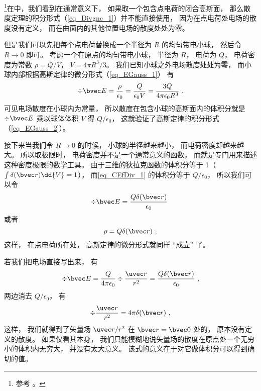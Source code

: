 

\footnote{参考 \cite{GriffE}。}在中，我们看到在通常意义下， 如果取一个包含点电荷的闭合高斯面， 那么散度定理的积分形式（\autoref{eq_Divgnc_1}）并不能直接使用， 因为在点电荷处电场的散度没有定义， 而在曲面内的其他位置电场的散度处处为零。

但是我们可以先把每个点电荷替换成一个半径为 $R$ 的均匀带电小球， 然后令 $R\to 0$ 即可。 考虑一个在原点的均匀带电小球， 半径为 $R$， 电荷为 $Q$， 电荷密度为常数 $\rho = Q/V$， $V = 4\pi R^3/3$。 我们已知小球之外电场散度处处为零， 而小球内部根据高斯定律的微分形式（\autoref{eq_EGauss_1}） 有
\begin{equation}\label{eq_CEfDiv_1}
\div \bvec E = \frac{\rho}{\epsilon_0} = \frac{Q}{\epsilon_0 V} = \frac{3Q}{4\pi \epsilon_0 R^3}~.
\end{equation}
可见电场散度在小球内为常量， 所以散度在包含小球的高斯面内的体积分就是 $\div \bvec E$ 乘以球体体积 $V$ 得 $Q/\epsilon_0$， 这就验证了高斯定律的积分形式（\autoref{eq_EGauss_2}）。

接下来当我们令 $R\to 0$ 的时候， 小球的半径越来越小， 而电荷密度却越来越大。 所以取极限时， 电荷密度并不是一个通常意义的函数， 而就是专门用来描述这种密度极限的数学工具。 由于三维的狄拉克函数的体积分等于 1（$\int \delta(\bvec r)\dd{V} = 1$）， 而\autoref{eq_CEfDiv_1} 的体积分等于 $Q/\epsilon_0$， 所以我们可以令
\begin{equation}
\div \bvec E = \frac{Q\delta(\bvec r)}{\epsilon_0}~
\end{equation}
或者
\begin{equation}
\rho = Q\delta(\bvec r)~,
\end{equation}
这样， 在点电荷所在处， 高斯定律的微分形式就同样 “成立” 了。

若我们把电场直接写出来， 有
\begin{equation}
\div \bvec E = \frac{Q}{4\pi\epsilon_0}\div \frac{\uvec r}{r^2} = \frac{Q\delta(\bvec r)}{\epsilon_0}~,
\end{equation}
两边消去 $Q/\epsilon_0$， 有
\begin{equation}\label{eq_CEfDiv_2}
\div \frac{\uvec r}{r^2} = 4\pi\delta(\bvec r)~,
\end{equation}
这样， 我们就得到了矢量场 ${\uvec r}/{r^2}$ 在 $\bvec r = \bvec 0$ 处的， 原本没有定义的散度。 如果仅看其本身， 我们只能模糊地说矢量场的散度在原点处一个无穷小的体积内无穷大， 并没有太大意义。 该式的意义在于对它做体积分可以得到确切的值。
